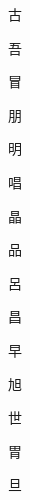\begin{spacing}{2.5}
{\Huge \begin{CJK}{UTF8}{min} 古\end{CJK}}\hspace{0.1cm}
{\Huge \begin{CJK}{UTF8}{min} 吾\end{CJK}}\hspace{0.1cm}
{\Huge \begin{CJK}{UTF8}{min} 冒\end{CJK}}\hspace{0.1cm}
{\Huge \begin{CJK}{UTF8}{min} 朋\end{CJK}}\hspace{0.1cm}
{\Huge \begin{CJK}{UTF8}{min} 明\end{CJK}}\hspace{0.1cm}
{\Huge \begin{CJK}{UTF8}{min} 唱\end{CJK}}\hspace{0.1cm}
{\Huge \begin{CJK}{UTF8}{min} 晶\end{CJK}}\hspace{0.1cm}
{\Huge \begin{CJK}{UTF8}{min} 品\end{CJK}}\hspace{0.1cm}
{\Huge \begin{CJK}{UTF8}{min} 呂\end{CJK}}\hspace{0.1cm}
{\Huge \begin{CJK}{UTF8}{min} 昌\end{CJK}}\hspace{0.1cm}
{\Huge \begin{CJK}{UTF8}{min} 早\end{CJK}}\hspace{0.1cm}
{\Huge \begin{CJK}{UTF8}{min} 旭\end{CJK}}\hspace{0.1cm}
{\Huge \begin{CJK}{UTF8}{min} 世\end{CJK}}\hspace{0.1cm}
{\Huge \begin{CJK}{UTF8}{min} 胃\end{CJK}}\hspace{0.1cm}
{\Huge \begin{CJK}{UTF8}{min} 旦\end{CJK}}\hspace{0.1cm}

\end{spacing}
